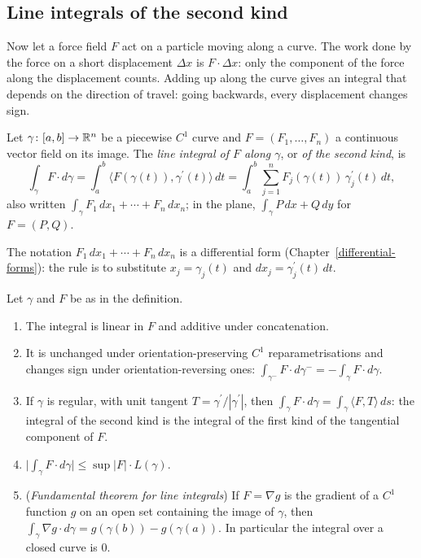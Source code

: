 \subsection{Line integrals of the second kind}\label{real-analysis:subsection-second-kind}

Now let a force field $F$ act on a particle moving along a curve. The work done by the force on a short displacement $\Delta x$ is $F \cdot \Delta x$: only the component of the force along the
displacement counts. Adding up along the curve gives an integral that depends on the direction of travel: going backwards, every displacement changes sign.

\begin{definition}\label{real-analysis:definition-second-kind}
Let $\gamma \colon [a, b] \to \mathbb{R}^n$ be a piecewise $C^1$ curve and $F = (F_1, \ldots, F_n)$ a continuous vector field on its image. The \emph{line integral of $F$ along $\gamma$}, or \emph{of the second kind},
is
\[
\int_\gamma F \cdot d\gamma = \int_a^b\bigl\langle F(\gamma(t)), \gamma^{\prime}(t)\bigr\rangle\,dt = \int_a^b\sum_{j=1}^nF_j(\gamma(t))\,\gamma_j^{\prime}(t)\,dt,
\]
also written $\int_\gamma F_1\,dx_1 + \cdots + F_n\,dx_n$; in the plane, $\int_\gamma P\,dx + Q\,dy$ for $F = (P, Q)$.
\end{definition}

The notation $F_1\,dx_1 + \cdots + F_n\,dx_n$ is a differential form (Chapter~\ref{differential-forms}): the rule is to substitute $x_j = \gamma_j(t)$ and $dx_j = \gamma_j^{\prime}(t)\,dt$.

\begin{proposition}\label{real-analysis:proposition-second-kind}
Let $\gamma$ and $F$ be as in the definition.
\begin{enumerate}
\item The integral is linear in $F$ and additive under concatenation.
\item It is unchanged under orientation-preserving $C^1$ reparametrisations and changes sign under orientation-reversing ones: $\int_{\gamma^-}F \cdot d\gamma^- = -\int_\gamma F \cdot d\gamma$.
\item If $\gamma$ is regular, with unit tangent $T = \gamma^{\prime}/|\gamma^{\prime}|$, then $\int_\gamma F \cdot d\gamma = \int_\gamma\langle F, T\rangle\,ds$: the integral of the second kind is the integral of the first kind of
the tangential component of $F$.
\item $\bigl|\int_\gamma F \cdot d\gamma\bigr| \leq \sup|F| \cdot L(\gamma)$.
\item (\emph{Fundamental theorem for line integrals}) If $F = \nabla g$ is the gradient of a $C^1$ function $g$ on an open set containing the image of $\gamma$, then
$\int_\gamma\nabla g \cdot d\gamma = g(\gamma(b)) - g(\gamma(a))$. In particular the integral over a closed curve is $0$.
\end{enumerate}
\end{proposition}


